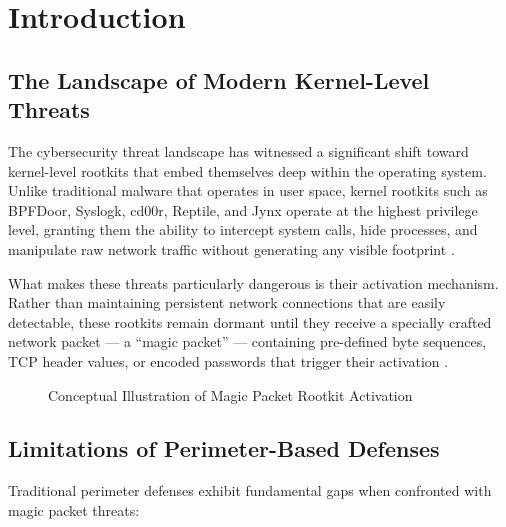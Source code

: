 \chapter{Introduction}

\section{The Landscape of Modern Kernel-Level Threats}

The cybersecurity threat landscape has witnessed a significant shift toward kernel-level rootkits that embed themselves deep within the operating system. Unlike traditional malware that operates in user space, kernel rootkits such as BPFDoor, Syslogk, cd00r, Reptile, and Jynx operate at the highest privilege level, granting them the ability to intercept system calls, hide processes, and manipulate raw network traffic without generating any visible footprint \cite{elastic2022bpfdoor, avast2022syslogk}.

What makes these threats particularly dangerous is their activation mechanism. Rather than maintaining persistent network connections that are easily detectable, these rootkits remain dormant until they receive a specially crafted network packet --- a ``magic packet'' --- containing pre-defined byte sequences, TCP header values, or encoded passwords that trigger their activation \cite{trend2022bpfdoor}.

\begin{figure}[h]
\centering
{}
\caption{Conceptual Illustration of Magic Packet Rootkit Activation}
\label{fig:magic_packet_concept}
\end{figure}

\section{Limitations of Perimeter-Based Defenses}

Traditional perimeter defenses exhibit fundamental gaps when confronted with magic packet threats:

